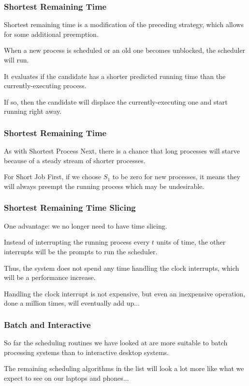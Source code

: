 \begin{frame}
\frametitle{Shortest Remaining Time}

Shortest remaining time is a modification of the preceding strategy, which allows for some additional preemption. 

When a new process is scheduled or an old one becomes unblocked, the scheduler will run.

It evaluates if the candidate has a shorter predicted running time than the currently-executing process. 

If so, then the candidate will displace the currently-executing one and start running right away.


\end{frame}

\begin{frame}
\frametitle{Shortest Remaining Time}

As with Shortest Process Next, there is a chance that long processes will starve because of a steady stream of shorter processes. 

For Short Job First, if we choose $S_{1}$ to be zero for new processes, it means they will always preempt the running process which may be undesirable.


\end{frame}

\begin{frame}
\frametitle{Shortest Remaining Time Slicing}

One advantage: we no longer need to have time slicing. 

Instead of interrupting the running process every $t$ units of time, the other interrupts will be the prompts to run the scheduler. 

Thus, the system does not spend any time handling the clock interrupts, which will be a performance increase. 

Handling the clock interrupt is not expensive, but even an inexpensive operation, done a million times, will eventually add up...


\end{frame}



\begin{frame}
\frametitle{Batch and Interactive}

So far the scheduling routines we have looked at are more suitable to batch processing systems than to interactive desktop systems. 

The remaining scheduling algorithms in the list will look a lot more like what we expect to see on our laptops and phones...


\end{frame}



